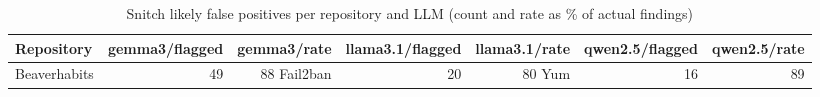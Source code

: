 \begin{table}[htbp]
\centering
\begin{tabular}{lrrrrrr}
\hline
Repository & gemma3/flagged & gemma3/rate & llama3.1/flagged & llama3.1/rate & qwen2.5/flagged & qwen2.5/rate \\
\hline
Beaverhabits & 49 & 88%
Fail2ban & 20 & 80%
Yum & 16 & 89%
\hline
\end{tabular}
\caption{Snitch likely false positives per repository and LLM (count and rate as \% of actual findings)}
\label{tab:snitch_fp}
\end{table}
